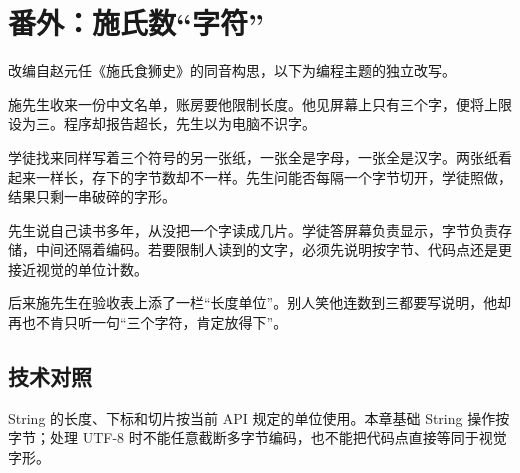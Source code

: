 \section{番外：施氏数“字符”}

改编自赵元任《施氏食狮史》的同音构思，以下为编程主题的独立改写。

施先生收来一份中文名单，账房要他限制长度。他见屏幕上只有三个字，便将上限设为三。程序却报告超长，先生以为电脑不识字。

学徒找来同样写着三个符号的另一张纸，一张全是字母，一张全是汉字。两张纸看起来一样长，存下的字节数却不一样。先生问能否每隔一个字节切开，学徒照做，结果只剩一串破碎的字形。

先生说自己读书多年，从没把一个字读成几片。学徒答屏幕负责显示，字节负责存储，中间还隔着编码。若要限制人读到的文字，必须先说明按字节、代码点还是更接近视觉的单位计数。

后来施先生在验收表上添了一栏“长度单位”。别人笑他连数到三都要写说明，他却再也不肯只听一句“三个字符，肯定放得下”。

\subsection*{技术对照}

String 的长度、下标和切片按当前 API 规定的单位使用。本章基础 String 操作按字节；处理 UTF-8 时不能任意截断多字节编码，也不能把代码点直接等同于视觉字形。

